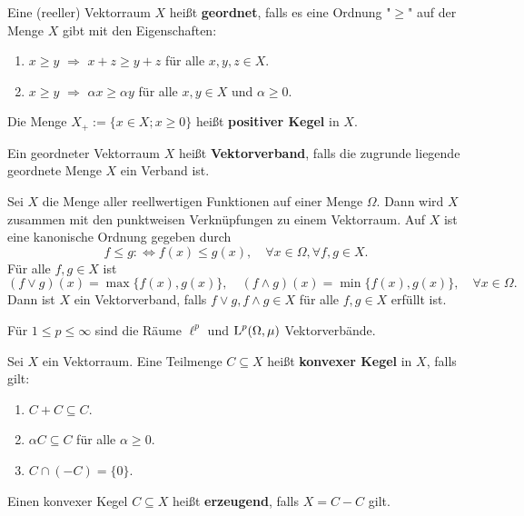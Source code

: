 \begin{defi}
Eine (reeller) Vektorraum $X$ heißt \textbf{geordnet}, falls es eine Ordnung "$\geq$"\; auf der Menge $X$ gibt mit den Eigenschaften:
\begin{enumerate}
\item $x\geq y$ $\Rightarrow$ $x+z\geq y+z$ für alle $x,y,z\in X$. 
\item $x\geq y$ $\Rightarrow$ $\alpha x\geq \alpha y$ für alle $x,y\in X$ und $\alpha\geq0$.
\end{enumerate}
Die Menge $X_+:=\{x\in X; x\geq0\}$ heißt \textbf{positiver Kegel} in $X$. 
\par
Ein geordneter Vektorraum $X$ heißt \textbf{Vektorverband}, falls die zugrunde liegende geordnete Menge $X$ ein Verband ist. 
\end{defi}

\begin{bsp}
Sei $X$ die Menge aller reellwertigen Funktionen auf einer Menge $\Omega$. Dann wird $X$  zusammen mit den punktweisen Verknüpfungen zu einem Vektorraum.
Auf $X$ ist eine kanonische Ordnung gegeben durch
\begin{equation*}
f\leq g:\iff f(x)\leq g(x),\quad\forall x\in \Omega,\forall f,g\in X.
\end{equation*}
Für alle $f,g\in X$ ist
\begin{equation*}
(f\vee g)(x)=\max\{f(x), g(x)\},\quad (f\wedge g)(x)=\min\{f(x), g(x)\},\quad\forall x\in\Omega.
\end{equation*}
Dann ist $X$ ein Vektorverband, falls $f\vee g, f\wedge g\in X$ für alle $f,g\in X$ erfüllt ist. 
\par

\begin{bsp}
Für $1\leq p\leq\infty$ sind die Räume $\ell^p$ und $\textnormal{L}^p(\Omega,\mu)$  Vektorverbände.
\end{bsp}



\end{bsp}

\begin{bem}
Sei $X$  ein Vektorraum. Eine Teilmenge $C\subseteq X$ heißt \textbf{konvexer Kegel} in $X$, falls gilt:
\begin{enumerate}
\item $C+C\subseteq C$.
\item $\alpha C\subseteq C$ für alle $\alpha\geq0$.
\item $C\cap(-C)=\{0\}$.
\end{enumerate}
Einen konvexer Kegel $C\subseteq X$ heißt \textbf{erzeugend}, falls $X=C-C$ gilt.
\end{bem}

